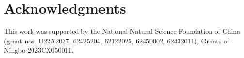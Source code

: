 \documentclass{article}
\begin{document}
\section*{Acknowledgments}
This work was supported by the National Natural Science Foundation of China (grant nos. U22A2037, 62425204, 62122025, 62450002, 62432011), Grants of Ningbo 2023CX050011. %

































































































































\end{document}
